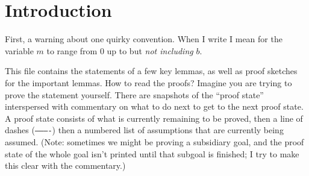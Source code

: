 \documentclass{article}
\begin{document}
\section*{Introduction}
First, a warning about one quirky convention.
When I write  I mean for the variable $m$ to range from $0$ up to but \emph{not including} $b$.

This file contains the statements of a few key lemmas, as well as proof sketches for the important lemmas.
How to read the proofs?
Imagine you are trying to prove the statement yourself.
There are snapshots of the ``proof state'' interspersed with commentary on what to do next to get to the next proof state.
A proof state consists of what is currently remaining to be proved, then a line of dashes (\texttt{----------}) then a numbered list of assumptions that are currently being assumed.
(Note: sometimes we might be proving a subsidiary goal, and the proof state of the whole goal isn't printed until that subgoal is finished; I try to make this clear with the commentary.)
\end{document}
